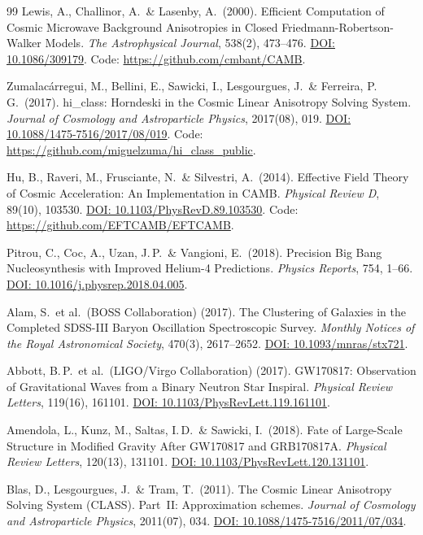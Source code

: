\documentclass[aps,prd,twocolumn,superscriptaddress,nofootinbib]{revtex4-2}
\begin{document}
\begin{thebibliography}{99}
Lewis, A., Challinor, A.\ \& Lasenby, A.\ (2000).
Efficient Computation of Cosmic Microwave Background Anisotropies in Closed Friedmann-Robertson-Walker Models.
\textit{The Astrophysical Journal}, 538(2), 473--476.
\href{https://doi.org/10.1086/309179}{DOI: 10.1086/309179}. Code: \url{https://github.com/cmbant/CAMB}.

Zumalac\'arregui, M., Bellini, E., Sawicki, I., Lesgourgues, J.\ \& Ferreira, P.\,G.\ (2017).
hi\_class: Horndeski in the Cosmic Linear Anisotropy Solving System.
\textit{Journal of Cosmology and Astroparticle Physics}, 2017(08), 019.
\href{https://doi.org/10.1088/1475-7516/2017/08/019}{DOI: 10.1088/1475-7516/2017/08/019}. Code: \url{https://github.com/miguelzuma/hi_class_public}.

Hu, B., Raveri, M., Frusciante, N.\ \& Silvestri, A.\ (2014).
Effective Field Theory of Cosmic Acceleration: An Implementation in CAMB.
\textit{Physical Review D}, 89(10), 103530.
\href{https://doi.org/10.1103/PhysRevD.89.103530}{DOI: 10.1103/PhysRevD.89.103530}. Code: \url{https://github.com/EFTCAMB/EFTCAMB}.

Pitrou, C., Coc, A., Uzan, J.\,P.\ \& Vangioni, E.\ (2018).
Precision Big Bang Nucleosynthesis with Improved Helium-4 Predictions.
\textit{Physics Reports}, 754, 1--66.
\href{https://doi.org/10.1016/j.physrep.2018.04.005}{DOI: 10.1016/j.physrep.2018.04.005}.

Alam, S.\ et al.\ (BOSS Collaboration) (2017).
The Clustering of Galaxies in the Completed SDSS-III Baryon Oscillation Spectroscopic Survey.
\textit{Monthly Notices of the Royal Astronomical Society}, 470(3), 2617--2652.
\href{https://doi.org/10.1093/mnras/stx721}{DOI: 10.1093/mnras/stx721}.

Abbott, B.\,P.\ et al.\ (LIGO/Virgo Collaboration) (2017).
GW170817: Observation of Gravitational Waves from a Binary Neutron Star Inspiral.
\textit{Physical Review Letters}, 119(16), 161101.
\href{https://doi.org/10.1103/PhysRevLett.119.161101}{DOI: 10.1103/PhysRevLett.119.161101}.

Amendola, L., Kunz, M., Saltas, I.\,D.\ \& Sawicki, I.\ (2018).
Fate of Large-Scale Structure in Modified Gravity After GW170817 and GRB170817A.
\textit{Physical Review Letters}, 120(13), 131101.
\href{https://doi.org/10.1103/PhysRevLett.120.131101}{DOI: 10.1103/PhysRevLett.120.131101}.

Blas, D., Lesgourgues, J.\ \& Tram, T.\ (2011).
The Cosmic Linear Anisotropy Solving System (CLASS). Part~II: Approximation schemes.
\textit{Journal of Cosmology and Astroparticle Physics}, 2011(07), 034.
\href{https://doi.org/10.1088/1475-7516/2011/07/034}{DOI: 10.1088/1475-7516/2011/07/034}.


\end{thebibliography}
\end{document}
